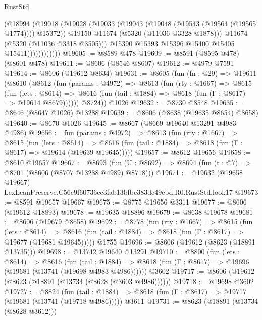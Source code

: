 \begin{lexlean}{RustStd}
\begin{coremodule}
                          (@18994
                            (@19018
                              (@19028
                                (@19033 (@19043 (@19048 (@19543 (@19564 (@19565 @1774)))) @15372))
                                @19150
                                @11674
                                (@5320 (@11036 @3328 @1878)))
                              @11674
                              (@5320 (@11036 @3318 @3505)))
                            @15390
                            @15393
                            @15396
                            @15400
                            @15405
                            @15411))))))))))))
@19605 := @8589 @478
@19609 := @8591 (@8595 @478) (@8601 @478)
@19611 := @8606 (@8546 @8607)
@19612 := @4979 @7591
@19614 := @8606 (@19612 @8634)
@19631 := @8605
    (fun (fn : @29) =>
    @19611
      (@8610
        (@8612
          (fun (params : @4972) =>
          @8613
            (fun (rty : @1667) =>
            @8615
              (fun (lets : @8614) =>
              @8616 (fun (tail : @1884) => @8618 (fun (Γ : @8617) => @19614 @8679))))))
        @8724))
    @1026
@19632 := @8730 @8548
@19635 := @8646 (@8647 @1026) @13288
@19639 := @8606 (@8638 (@19635 @8654) @8658)
@19640 := @8670 @1026
@19645 := @8667 (@8669 @19640 @13291 @4983 @4986)
@19656 := fun (params : @4972) =>
  @8613
    (fun (rty : @1667) =>
    @8615
      (fun (lets : @8614) =>
      @8616 (fun (tail : @1884) => @8618 (fun (Γ : @8617) => @19614 (@19639 @19645)))))
@19657 := @8612 @19656
@19658 := @8610 @19657
@19667 := @8693
    (fun (U : @8692) => @8694 (fun (t : @7) => @8701 (@8606 (@8707 @13288 @4989) @8718)))
@19671 := @19632 (@19658 @19667) LexLeanPreserve.C56c9f60736cc3fab13bfbc383dc49ebd.R0.RustStd.look17
@19673 := @8591 @19657 @19667
@19675 := @8775 @19656 @3311
@19677 := @8606 (@19612 @18893)
@19678 := @19635 @18896
@19679 := @8638 @19678
@19681 := @8606 (@19679 @8658)
@19692 := @8778
    (fun (rty : @1667) =>
    @8615
      (fun (lets : @8614) =>
      @8616 (fun (tail : @1884) => @8618 (fun (Γ : @8617) => @19677 (@19681 @19645)))))
    @1755
@19696 := @8606 (@19612 (@8623 (@18891 @13735)))
@19698 := @13742 @19640 @13291
@19710 := @8800
    (fun (lets : @8614) =>
    @8616
      (fun (tail : @1884) =>
      @8618 (fun (Γ : @8617) => @19696 (@19681 (@13741 (@19698 @4983 @4986))))))
    @3602
@19717 := @8606 (@19612 (@8623 (@18891 (@13734 (@8628 (@3603 @4986))))))
@19718 := @19698 @3602
@19727 := @8824
    (fun (tail : @1884) => @8618 (fun (Γ : @8617) => @19717 (@19681 (@13741 (@19718 @4986)))))
    @3611
@19731 := @8623 (@18891 (@13734 (@8628 @3612)))

\end{coremodule}
\end{lexlean}
